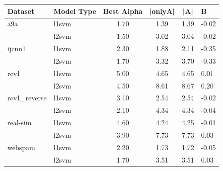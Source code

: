 \begin{tabular}{llccc}
Dataset & Model Type & Best Alpha & |onlyA| & |A| & B \\
\hline
a9a & l1svm & 1.70 & 1.39 & 1.39 & -0.02 \\
 & l2svm & 1.50 & 3.02 & 3.04 & -0.02 \\
\hline
ijcnn1 & l1svm & 2.30 & 1.88 & 2.11 & -0.35 \\
 & l2svm & 1.70 & 3.32 & 3.70 & -0.33 \\
\hline
rcv1 & l1svm & 5.00 & 4.65 & 4.65 & 0.01 \\
 & l2svm & 4.50 & 8.61 & 8.67 & 0.20 \\
\hline
rcv1_reverse & l1svm & 3.10 & 2.54 & 2.54 & -0.02 \\
 & l2svm & 2.10 & 4.34 & 4.34 & -0.04 \\
\hline
real-sim & l1svm & 4.60 & 4.24 & 4.25 & -0.01 \\
 & l2svm & 3.90 & 7.73 & 7.73 & 0.03 \\
\hline
webspam & l1svm & 2.20 & 1.73 & 1.72 & -0.05 \\
 & l2svm & 1.70 & 3.51 & 3.51 & 0.03 \\
\hline
\end{tabular}